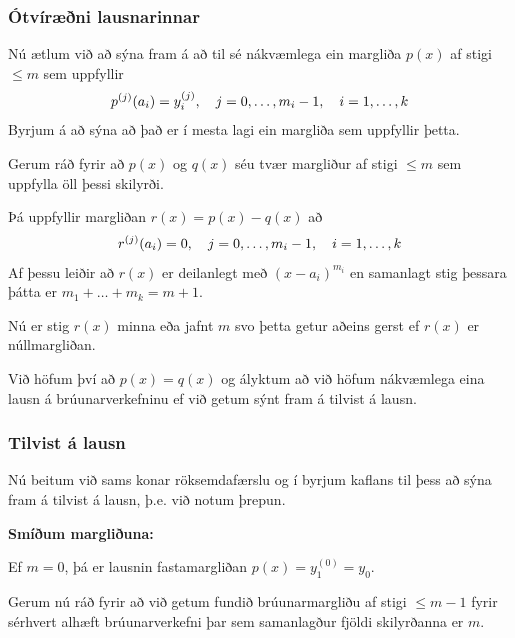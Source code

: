 \documentclass[a4paper,10pt,icelandic]{sphinxmanual}
\begin{document}
\subsubsection{Ótvíræðni lausnarinnar}
\label{kafli03:otviraeni-lausnarinnar}
Nú ætlum við að sýna fram á að til sé nákvæmlega ein margliða
\(p(x)\) af stigi \(\leq m\) sem uppfyllir
\begin{gather}
\begin{split}p^{(j)}(a_i) = y_i^{(j)},
  \quad j = 0, \ldots, m_i-1, \quad i = 1, \ldots, k\end{split}\notag
\end{gather}
Byrjum á að sýna að það er í mesta lagi ein margliða sem uppfyllir þetta.

Gerum ráð fyrir að
\(p(x)\) og \(q(x)\) séu tvær margliður af stigi \(\leq m\)
sem uppfylla öll þessi skilyrði.

Þá uppfyllir margliðan \(r(x) = p(x) - q(x)\) að
\begin{gather}
\begin{split}r^{(j)}(a_i) = 0, \quad j = 0, \ldots, m_i-1,
  \quad i = 1, \ldots,k\end{split}\notag
\end{gather}
Af þessu leiðir að \(r(x)\) er deilanlegt með \((x-a_i)^{m_i}\)
en samanlagt stig þessara þátta er \(m_1 + \ldots + m_k = m + 1\).

Nú er stig \(r(x)\) minna eða jafnt \(m\) svo þetta getur aðeins
gerst ef \(r(x)\) er núllmargliðan.

Við höfum því að \(p(x) = q(x)\) og ályktum að við höfum nákvæmlega
eina lausn á brúunarverkefninu ef við getum sýnt fram á tilvist á lausn.


\subsubsection{Tilvist á lausn}
\label{kafli03:tilvist-a-lausn}
Nú beitum við sams konar röksemdafærslu og í byrjum kaflans til þess að sýna
fram á tilvist á lausn, þ.e. við notum þrepun.

\textbf{Smíðum margliðuna:}

Ef \(m = 0\), þá er lausnin fastamargliðan
\(p(x) = y_1^{(0)}=y_0\).

Gerum nú ráð fyrir að við getum fundið brúunarmargliðu af stigi
\(\leq m-1\) fyrir sérhvert alhæft brúunarverkefni þar sem
samanlagður fjöldi skilyrðanna er \(m\).
\end{document}
